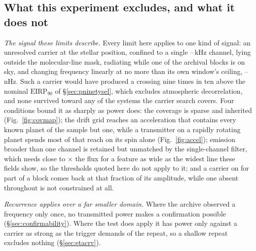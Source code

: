 \subsection{What this experiment excludes, and what it does not}
\label{sec:excludes}

\noindent\emph{The signal these limits describe.} Every limit here applies to
one kind of signal: an unresolved carrier at the stellar position, confined to
a single \ChanLoA--\ChanHiA\,kHz channel, lying outside the molecular-line
mask, radiating while one of the archival blocks is on sky, and changing
frequency linearly at no more than its own window's ceiling,
\DriftCeilLo--\DriftCeilHi\,nHz. Such a carrier would
have produced a crossing nine times in ten above the nominal
$\mathrm{EIRP}_{90}$ of \S\ref{sec:pninetysel}, which excludes atmospheric
decorrelation, and none survived toward any of the \NSysClassA{}
systems the carrier search covers. Four conditions
bound it as sharply as power does: the coverage is sparse and
inherited (Fig.~\ref{fig:covmap}); the drift grid reaches an acceleration that contains every
known planet of the sample but one, while a transmitter on a rapidly rotating
planet spends most of that reach on its spin alone (Fig.~\ref{fig:accel}); emission broader than one channel is
retained but unmatched by the single-channel filter, which needs close to
\ScNBroadRatio$\times$ the flux for a feature as wide as the widest line these
fields show, so the thresholds quoted here do not apply to it; and a carrier on for part of a block comes
back at that fraction of its amplitude, while one absent throughout is not
constrained at all.

\noindent\emph{Recurrence applies over a far smaller domain.} Where the
archive observed a frequency only once, no transmitted power makes a
confirmation possible (\S\ref{sec:confirmability}). Where the test does apply
it has power only against a carrier as strong as the trigger demands of the
repeat, so a shallow repeat excludes nothing (\S\ref{sec:etacrv}).

